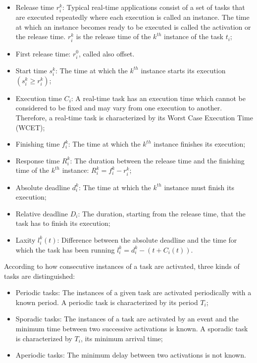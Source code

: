 \begin{itemize}
\item Release time $r^k_i$: Typical real-time applications consist of a set of tasks that are executed repeatedly where each execution is called an instance. The time at which an instance becomes ready to be executed is called the activation or the release time. $r^k_i$ is the release time of the $k^{th}$ instance of the task $t_i$;
\item First release time: $r^0_i$, called also offset.
\item Start time $s^k_i$: The time at which the $k^{th}$ instance starts its execution $(s^k_i \geq r^k_i)$;
\item Execution time $C_i$: A real-time task has an execution time which cannot be considered to be fixed and may vary from one execution to another. Therefore, a real-time task is characterized by its Worst Case Execution Time (WCET);
\item Finishing time $f^k_i$: The time at which the $k^{th}$ instance finishes its execution;
\item Response time $R^k_i$: The duration between the release time and the finishing time of the $k^{th}$ instance: $R^k_i = f^k_i - r^k_i$;
\item Absolute deadline $d^k_i$: The time at which the $k^{th}$ instance must finish its execution;
\item Relative deadline $D_i$: The duration, starting from the release time, that the task has to finish its execution;
\item Laxity $l^k_i(t)$: Difference between the absolute deadline and the time for which the task has been running $l^k_i=d^k_i-(t+C_i(t))$.
\end{itemize}

\noindent According to how consecutive instances of a task are activated, three kinds of tasks are distinguished:
\begin{itemize}
\item Periodic tasks: The instances of a given task are activated periodically with a known period. A periodic task is characterized by its period $T_i$;
\item Sporadic tasks: The instances of a task are activated by an event and the minimum time between two successive activations is known. A sporadic task is characterized by $T_i$, its minimum arrival time;
\item Aperiodic tasks: The minimum delay between two activations is not known.
\end{itemize} 

